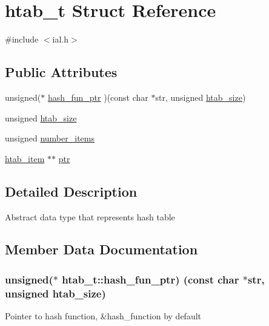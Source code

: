\hypertarget{structhtab__t}{}\section{htab\+\_\+t Struct Reference}
\label{structhtab__t}


{\ttfamily \#include $<$ial.\+h$>$}

\subsection*{Public Attributes}
\begin{DoxyCompactItemize}
\item 
unsigned($\ast$ \hyperlink{structhtab__t_adeb6903d98e803769a5d9f5600f2878f}{hash\+\_\+fun\+\_\+ptr} )(const char $\ast$str, unsigned \hyperlink{structhtab__t_a2565e30da8192e773408aa47e9c69b9c}{htab\+\_\+size})
\item 
unsigned \hyperlink{structhtab__t_a2565e30da8192e773408aa47e9c69b9c}{htab\+\_\+size}
\item 
unsigned \hyperlink{structhtab__t_a42e08f3235d283aa7a4bd4ce715083f6}{number\+\_\+items}
\item 
\hyperlink{structhtab__item}{htab\+\_\+item} $\ast$$\ast$ \hyperlink{structhtab__t_a690071ddbcc17c986b7eb600d925a1dd}{ptr}
\end{DoxyCompactItemize}


\subsection{Detailed Description}
Abstract data type that represents hash table 

\subsection{Member Data Documentation}
\hypertarget{structhtab__t_adeb6903d98e803769a5d9f5600f2878f}{}
\subsubsection[{hash\+\_\+fun\+\_\+ptr}]{\setlength{\rightskip}{0pt plus 5cm}unsigned($\ast$ htab\+\_\+t\+::hash\+\_\+fun\+\_\+ptr) (const char $\ast$str, unsigned {\bf htab\+\_\+size})}\label{structhtab__t_adeb6903d98e803769a5d9f5600f2878f}
Pointer to hash function, \&hash\+\_\+function by default \hypertarget{structhtab__t_a2565e30da8192e773408aa47e9c69b9c}{}
